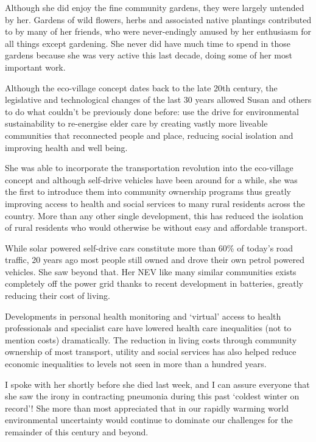Although she did enjoy the fine community gardens, they were largely untended by her. Gardens of wild flowers, herbs and associated native plantings contributed to by many of her friends, who were never-endingly amused by her enthusiasm for all things except gardening. She never did have much time to spend in those gardens because she was very active this last decade, doing some of her most important work.

Although the eco-village concept dates back to the late 20th century, the legislative and technological changes of the last 30 years allowed Susan and others to do what couldn't be previously done before: use the drive for environmental sustainability to re-energise elder care by creating vastly more liveable communities that reconnected people and place, reducing social isolation and improving health and well being. 

She was able to incorporate the transportation revolution into the eco-village concept and although self-drive vehicles have been around for a while, she was the first to introduce them into community ownership programs thus greatly improving access to health and social services to many rural residents across the country. More than any other single development, this has reduced the isolation of rural residents who would otherwise be without easy and affordable transport.

While solar powered self-drive cars constitute more than 60\% of today's road traffic, 20 years ago most people still owned and drove their own petrol powered vehicles. She saw beyond that. Her NEV like many similar communities exists completely off the power grid thanks to recent development in batteries, greatly reducing their cost of living.

Developments in personal health monitoring and ‘virtual’ access to health professionals and specialist care have lowered health care inequalities (not to mention costs) dramatically. The reduction in living costs through community ownership of most transport, utility and social services has also helped reduce economic inequalities to levels not seen in more than a hundred years.

I spoke with her shortly before she died last week, and I can assure everyone that she saw the irony in contracting pneumonia during this past `coldest winter on record'! She more than most appreciated that in our rapidly warming world environmental uncertainty would continue to dominate our challenges for the remainder of this century and beyond. 

